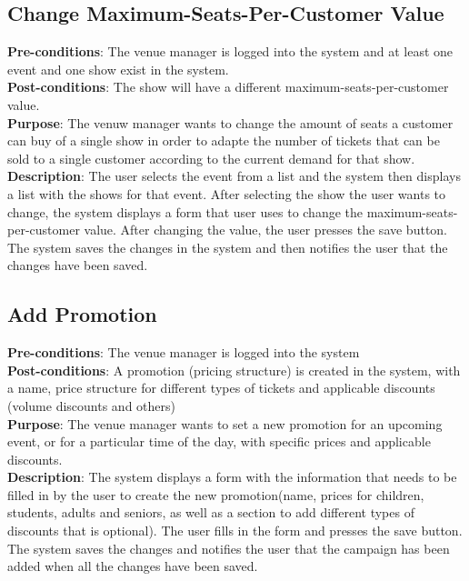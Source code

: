 \subsection{Change Maximum-Seats-Per-Customer Value}
\textbf{Pre-conditions}: The venue manager is logged into the system
and at least one event and one show exist in the system.\\

\textbf{Post-conditions}: The show will have a different
maximum-seats-per-customer value.\\

\textbf{Purpose}: The venuw manager wants to change the amount of
seats a customer can buy of a single show in order to adapte the
number of tickets that can be sold to a single customer according
to the current demand for that show.\\

\textbf{Description}: The user selects the event from a list and the
system then displays a list with the shows for that event. After
selecting the show the user wants to change, the system displays a
form that user uses to change the maximum-seats-per-customer value.
After changing the value, the user presses the save button. The
system saves the changes in the system and then notifies the user
that the changes have been saved.

\subsection{Add Promotion}
\textbf{Pre-conditions}: The venue manager is logged into the system\\

\textbf{Post-conditions}: A promotion (pricing structure) is created
in the system, with a name, price structure for different types of
tickets and applicable discounts (volume discounts and others)\\

\textbf{Purpose}: The venue manager wants to set a new promotion for
an upcoming event, or for a particular time of the day, with specific
prices and applicable discounts.\\

\textbf{Description}: The system displays a form with the information
that needs to be filled in by the user to create the new promotion(name,
prices for children, students, adults and seniors, as well as a section
to add different types of discounts that is optional). The user fills in
the form and presses the save button. The system saves the changes and
notifies the user that the campaign has been added when all the changes
have been saved.

